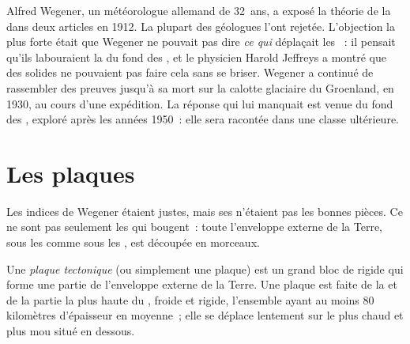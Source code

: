 \begin{history}
Alfred Wegener, un météorologue allemand de 32~ans, a exposé la théorie de
la  dans deux articles en 1912. La plupart des
géologues l'ont rejetée. L'objection la plus forte était que Wegener ne
pouvait pas dire \emph{ce qui} déplaçait les ~: il pensait qu'ils
labouraient la  du fond des , et le physicien Harold Jeffreys a
montré que des  solides ne pouvaient pas faire cela sans se
briser. Wegener a continué de rassembler des preuves jusqu'à sa mort sur
la calotte glaciaire du Groenland, en 1930, au cours d'une expédition. La
réponse qui lui manquait est venue du fond des , exploré après les
années 1950~: elle sera racontée dans une classe ultérieure.
\end{history}

\section{Les plaques}

Les indices de Wegener étaient justes, mais ses  n'étaient pas
les bonnes pièces. Ce ne sont pas seulement les  qui bougent~:
toute l'enveloppe externe de la Terre, sous les  comme sous les
, est découpée en morceaux.

\begin{definition}\label{def:g7:plate-tectonics:plate}
Une \emph{plaque tectonique} (ou simplement une
plaque) est un grand bloc de  rigide qui forme une partie de
l'enveloppe externe de la Terre. Une plaque est faite de la  et de la
partie la plus haute du , froide et rigide, l'ensemble ayant au
moins 80 kilomètres d'épaisseur en moyenne~; elle se déplace lentement
sur le  plus chaud et plus mou situé en dessous.
\end{definition}


